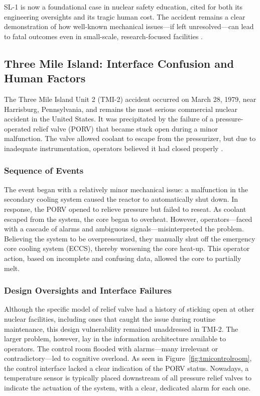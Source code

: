 \documentclass[12pt]{article}
\begin{document}
SL-1 is now a foundational case in nuclear safety education, cited for both its engineering oversights and its tragic human cost. The accident remains a clear demonstration of how well-known mechanical issues—if left unresolved—can lead to fatal outcomes even in small-scale, research-focused facilities \autocite{sl1report}.

\subsection{Three Mile Island: Interface Confusion and Human Factors}
The Three Mile Island Unit 2 (TMI-2) accident occurred on March 28, 1979, near Harrisburg, Pennsylvania, and remains the most serious commercial nuclear accident in the United States. It was precipitated by the failure of a pressure-operated relief valve (PORV) that became stuck open during a minor malfunction. The valve allowed coolant to escape from the pressurizer, but due to inadequate instrumentation, operators believed it had closed properly \autocite{tmiwalker}.

\subsubsection{Sequence of Events}
The event began with a relatively minor mechanical issue: a malfunction in the secondary cooling system caused the reactor to automatically shut down. In response, the PORV opened to relieve pressure but failed to reseat. As coolant escaped from the system, the core began to overheat. However, operators—faced with a cascade of alarms and ambiguous signals—misinterpreted the problem. Believing the system to be overpressurized, they manually shut off the emergency core cooling system (ECCS), thereby worsening the core heat-up. This operator action, based on incomplete and confusing data, allowed the core to partially melt.

\subsubsection{Design Oversights and Interface Failures}
Although the specific model of relief valve had a history of sticking open at other nuclear facilities, including ones that caught the issue during routine maintenance, this design vulnerability remained unaddressed in TMI-2. The larger problem, however, lay in the information architecture available to operators. The control room flooded with alarms—many irrelevant or contradictory—led to cognitive overload. As seen in Figure~\ref{fig:tmicontrolroom}, the control interface lacked a clear indication of the PORV status. Nowadays, a temperature sensor is typically placed downstream of all pressure relief valves to indicate the actuation of the system, with a clear, dedicated alarm for each one.
\end{document}
